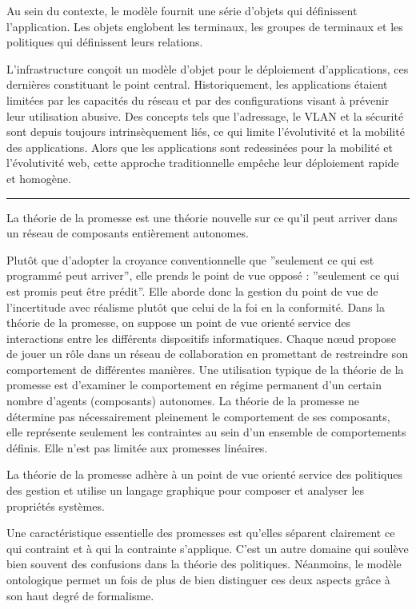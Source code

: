 Au sein du contexte, le modèle fournit une série d'objets qui définissent
l'application. Les objets englobent les terminaux, les groupes de terminaux et
les politiques qui définissent leurs relations.

L'infrastructure conçoit un modèle d'objet pour le déploiement d'applications,
ces dernières constituant le point central. Historiquement, les applications
étaient limitées par les capacités du réseau et par des configurations visant à
prévenir leur utilisation abusive. Des concepts tels que l'adressage, le VLAN et
la sécurité sont depuis toujours intrinsèquement liés, ce qui limite
l'évolutivité et la mobilité des applications. Alors que les applications sont
redessinées pour la mobilité et l'évolutivité web, cette approche traditionnelle
empêche leur déploiement rapide et homogène.

\noindent\rule{8cm}{0.4pt}

La théorie de la promesse est une théorie nouvelle sur ce qu'il peut arriver
dans un réseau de composants entièrement autonomes.

Plutôt que d'adopter la croyance conventionnelle que ''seulement ce qui est
programmé peut arriver'', elle prends le point de vue opposé : ''seulement ce
qui est promis peut être prédit''. Elle aborde donc la gestion du point de vue
de l'incertitude avec réalisme plutôt que celui de la foi en la conformité. Dans
la théorie de la promesse, on suppose un point de vue orienté service des
interactions entre les différents dispositifs informatiques. Chaque nœud propose
de jouer un rôle dans un réseau de collaboration en promettant de restreindre
son comportement de différentes manières. Une utilisation typique de la théorie
de la promesse est d'examiner le comportement en régime permanent d'un certain
nombre d'agents (composants) autonomes. La théorie de la promesse ne détermine
pas nécessairement pleinement le comportement de ses composants, elle représente
seulement les contraintes au sein d'un ensemble de comportements définis. Elle
n'est pas limitée aux promesses linéaires.

La théorie de la promesse adhère à un point de vue orienté service des
politiques des gestion et utilise un langage graphique pour composer et analyser
les propriétés systèmes.

Une caractéristique essentielle des promesses est qu'elles séparent clairement
ce qui contraint et à qui la contrainte s'applique. C'est un autre domaine qui
soulève bien souvent des confusions dans la théorie des politiques. Néanmoins,
le modèle ontologique permet un fois de plus de bien distinguer ces deux
aspects grâce à son haut degré de formalisme.

